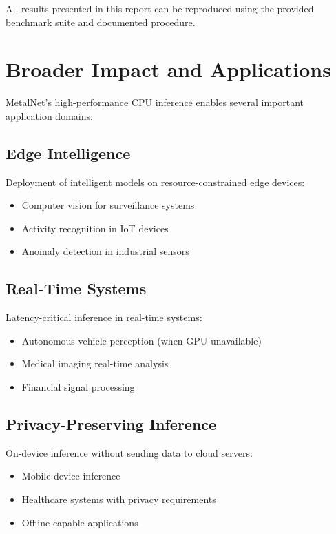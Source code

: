 \documentclass[12pt,oneside,a4paper]{report}
\begin{document}
All results presented in this report can be reproduced using the provided benchmark suite and documented procedure.

\section{Broader Impact and Applications}

MetalNet's high-performance CPU inference enables several important application domains:

\subsection{Edge Intelligence}

Deployment of intelligent models on resource-constrained edge devices:
\begin{itemize}
    \item Computer vision for surveillance systems
    \item Activity recognition in IoT devices
    \item Anomaly detection in industrial sensors
\end{itemize}

\subsection{Real-Time Systems}

Latency-critical inference in real-time systems:
\begin{itemize}
    \item Autonomous vehicle perception (when GPU unavailable)
    \item Medical imaging real-time analysis
    \item Financial signal processing
\end{itemize}

\subsection{Privacy-Preserving Inference}

On-device inference without sending data to cloud servers:
\begin{itemize}
    \item Mobile device inference
    \item Healthcare systems with privacy requirements
    \item Offline-capable applications
\end{itemize}
\end{document}
